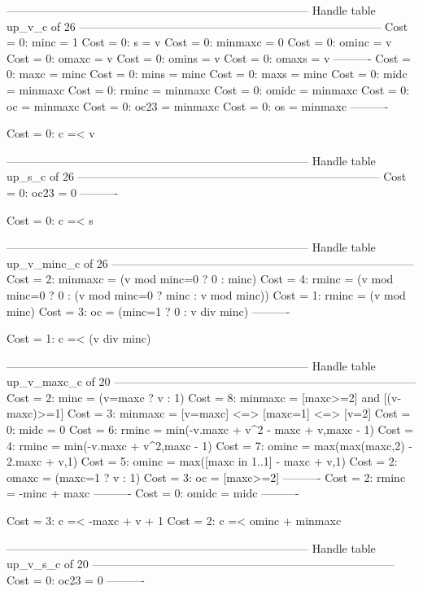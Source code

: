 --------------------------------------------------------------------------------
Handle table up_v_c of 26
--------------------------------------------------------------------------------
Cost =  0:  minc    = 1
Cost =  0:  s       = v
Cost =  0:  minmaxc = 0
Cost =  0:  ominc   = v
Cost =  0:  omaxc   = v
Cost =  0:  omins   = v
Cost =  0:  omaxs   = v
----------
Cost =  0:  maxc    = minc
Cost =  0:  mins    = minc
Cost =  0:  maxs    = minc
Cost =  0:  midc    = minmaxc
Cost =  0:  rminc   = minmaxc
Cost =  0:  omidc   = minmaxc
Cost =  0:  oc      = minmaxc
Cost =  0:  oc23    = minmaxc
Cost =  0:  os      = minmaxc
----------

Cost =  0:  c =< v

--------------------------------------------------------------------------------
Handle table up_s_c of 26
--------------------------------------------------------------------------------
Cost =  0:  oc23 = 0
----------

Cost =  0:  c =< s

--------------------------------------------------------------------------------
Handle table up_v_minc_c of 26
--------------------------------------------------------------------------------
Cost =  2:  minmaxc = (v mod minc=0 ? 0 : minc)
Cost =  4:  rminc   = (v mod minc=0 ? 0 : (v mod minc=0 ? minc : v mod minc))
Cost =  1:  rminc   = (v mod minc)
Cost =  3:  oc      = (minc=1 ? 0 : v div minc)
----------

Cost =  1:  c =< (v div minc)

--------------------------------------------------------------------------------
Handle table up_v_maxc_c of 20
--------------------------------------------------------------------------------
Cost =  2:  minc    = (v=maxc ? v : 1)
Cost =  8:  minmaxc = [maxc>=2] and [(v-maxc)>=1]
Cost =  3:  minmaxc = [v=maxc] <=> [maxc=1] <=> [v=2]
Cost =  0:  midc    = 0
Cost =  6:  rminc   = min(-v.maxc + v^2 - maxc + v,maxc - 1)
Cost =  4:  rminc   = min(-v.maxc + v^2,maxc - 1)
Cost =  7:  ominc   = max(max(maxc,2) - 2.maxc + v,1)
Cost =  5:  ominc   = max([maxc in 1..1] - maxc + v,1)
Cost =  2:  omaxc   = (maxc=1 ? v : 1)
Cost =  3:  oc      = [maxc>=2]
----------
Cost =  2:  rminc   = -minc + maxc
----------
Cost =  0:  omidc   = midc
----------

Cost =  3:  c =< -maxc + v + 1
Cost =  2:  c =< ominc + minmaxc

--------------------------------------------------------------------------------
Handle table up_v_s_c of 20
--------------------------------------------------------------------------------
Cost =  0:  oc23 = 0
----------

